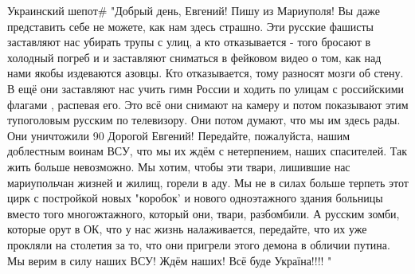 
Украинский шепот# "Добрый день, Евгений! Пишу из Мариуполя! Вы даже представить себе не можете, как нам здесь страшно. Эти русские фашисты заставляют нас убирать трупы с улиц, а кто отказывается - того бросают в холодный погреб и и заставляют сниматься в фейковом видео о том, как над нами якобы издеваются азовцы. Кто отказывается, тому разносят мозги об стену. В ещё они заставляют нас учить гимн России и ходить по улицам с российскими флагами , распевая его. Это всё они снимают на камеру и потом показывают этим тупоголовым русским по телевизору. Они потом думают, что мы им здесь рады. Они уничтожили 90%
Дорогой Евгений! Передайте, пожалуйста, нашим доблестным воинам ВСУ, что мы их ждём с нетерпением, наших спасителей. Так жить больше невозможно. Мы хотим, чтобы эти твари, лишившие нас мариупольчан жизней и жилищ, горели в аду. Мы не в силах больше терпеть этот цирк с постройкой новых "коробок' и нового одноэтажного здания больницы вместо того многожтажного, который они, твари, разбомбили. А русским зомби, которые орут в ОК, что у нас жизнь налаживается, передайте, что их уже прокляли на столетия за то, что они пригрели этого демона в обличии путина. Мы верим в силу наших ВСУ! Ждём наших! Всё буде Україна!!!! "

